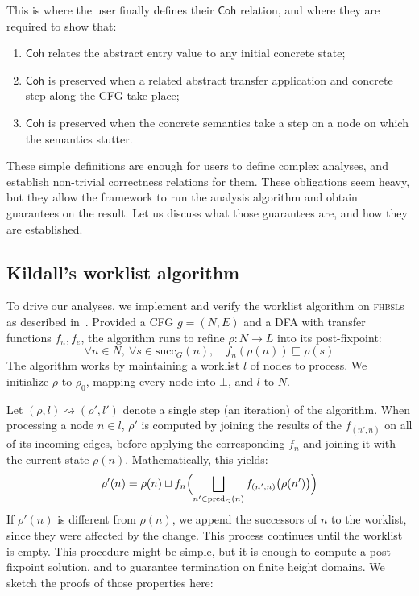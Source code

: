 \documentclass[runningheads]{llncs}
\newcommand{\lub}{\sqcup}
\newcommand{\squb}{\sqsubseteq}
\newcommand{\coh}{\mathsf{Coh}}
\newcommand{\fhbsl}{\textsc{fhbsl}}
\newcommand{\pred}{\mathrm{pred}}
\newcommand{\succG}{\mathrm{succ}}
\begin{document}
This is where the user finally defines their $\coh$ relation, and where they are required to show that:
\begin{enumerate}
  \item $\coh$ relates the abstract entry value to any initial concrete state;
  \item $\coh$ is preserved when a related abstract transfer application and concrete step along the CFG take place;
  \item $\coh$ is preserved when the concrete semantics take a step on a node on which the semantics stutter.
\end{enumerate}
These simple definitions are enough for users to define complex analyses, and establish non-trivial correctness relations for them. These obligations seem heavy, but they allow the framework to run the analysis algorithm and obtain guarantees on the result. Let us discuss what those guarantees are, and how they are established.

\subsection{Kildall's worklist algorithm}

To drive our analyses, we implement and verify the worklist algorithm on \fhbsl{}s as described in~\cite{Kildall73}. Provided a CFG $g = (N, E)$ and a DFA with transfer functions $f_n, f_e$, the algorithm runs to refine $\rho : N \to L$ into its post-fixpoint:
\[
  \forall n \in N,\ \forall s \in \succG_G(n),\quad f_n(\rho(n)) \squb \rho(s)
\]
The algorithm works by maintaining a worklist $l$ of nodes to process. We initialize $\rho$ to $\rho_0$, mapping every node into $\bot$, and $l$ to $N$.

Let $(\rho, l) \rightsquigarrow (\rho', l')$ denote a single step (an iteration) of the algorithm. When processing a node $n \in l$, $\rho'$ is computed by joining the results of the $f_{(n', n)}$ on all of its incoming edges, before applying the corresponding $f_n$ and joining it with the current state $\rho(n)$. Mathematically, this yields:
\[
  \rho'(n) = \rho(n) \lub f_n\Bigl(\bigsqcup_{n' \in \pred_G(n)} f_{(n', n)}\bigl(\rho(n')\bigr)\Bigr)
\]
If $\rho'(n)$ is different from $\rho(n)$, we append the successors of $n$ to the worklist, since they were affected by the change. This process continues until the worklist is empty. This procedure might be simple, but it is enough to compute a post-fixpoint solution, and to guarantee termination on finite height domains. We sketch the proofs of those properties here:
\end{document}
